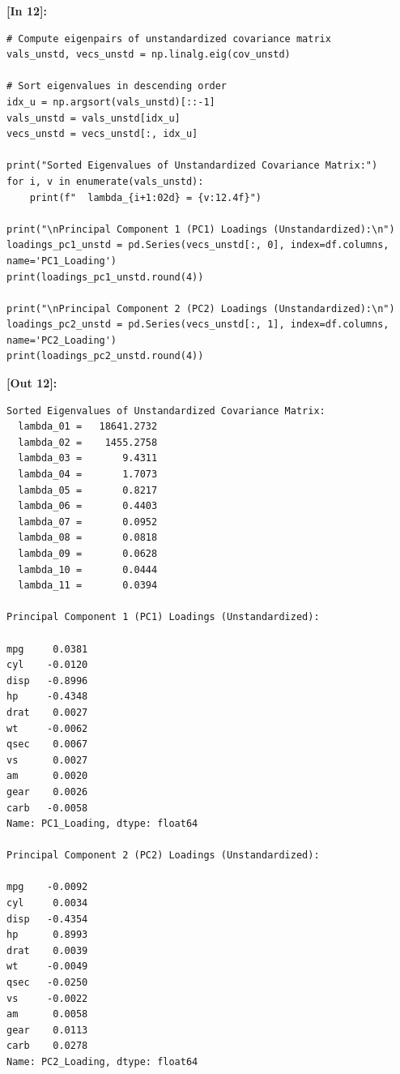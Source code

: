 \vspace{0.6em}
\noindent\textbf{\small [In 12]:}
\begin{lstlisting}[style=pycode]
# Compute eigenpairs of unstandardized covariance matrix
vals_unstd, vecs_unstd = np.linalg.eig(cov_unstd)

# Sort eigenvalues in descending order
idx_u = np.argsort(vals_unstd)[::-1]
vals_unstd = vals_unstd[idx_u]
vecs_unstd = vecs_unstd[:, idx_u]

print("Sorted Eigenvalues of Unstandardized Covariance Matrix:")
for i, v in enumerate(vals_unstd):
    print(f"  lambda_{i+1:02d} = {v:12.4f}")

print("\nPrincipal Component 1 (PC1) Loadings (Unstandardized):\n")
loadings_pc1_unstd = pd.Series(vecs_unstd[:, 0], index=df.columns, name='PC1_Loading')
print(loadings_pc1_unstd.round(4))

print("\nPrincipal Component 2 (PC2) Loadings (Unstandardized):\n")
loadings_pc2_unstd = pd.Series(vecs_unstd[:, 1], index=df.columns, name='PC2_Loading')
print(loadings_pc2_unstd.round(4))
\end{lstlisting}
\noindent\textbf{\small [Out 12]:}
\begin{lstlisting}[style=output]
Sorted Eigenvalues of Unstandardized Covariance Matrix:
  lambda_01 =   18641.2732
  lambda_02 =    1455.2758
  lambda_03 =       9.4311
  lambda_04 =       1.7073
  lambda_05 =       0.8217
  lambda_06 =       0.4403
  lambda_07 =       0.0952
  lambda_08 =       0.0818
  lambda_09 =       0.0628
  lambda_10 =       0.0444
  lambda_11 =       0.0394

Principal Component 1 (PC1) Loadings (Unstandardized):

mpg     0.0381
cyl    -0.0120
disp   -0.8996
hp     -0.4348
drat    0.0027
wt     -0.0062
qsec    0.0067
vs      0.0027
am      0.0020
gear    0.0026
carb   -0.0058
Name: PC1_Loading, dtype: float64

Principal Component 2 (PC2) Loadings (Unstandardized):

mpg    -0.0092
cyl     0.0034
disp   -0.4354
hp      0.8993
drat    0.0039
wt     -0.0049
qsec   -0.0250
vs     -0.0022
am      0.0058
gear    0.0113
carb    0.0278
Name: PC2_Loading, dtype: float64
\end{lstlisting}

